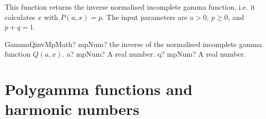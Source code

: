\vspace{0.3cm}
This function returns the inverse normalised incomplete gamma function, i.e. it calculates $x$ with $P(a,x) = p$. The input parameters are $a>0$, $p \geq 0$,  and $p+q=1$. 

\vspace{0.6cm}
\begin{mpFunctionsExtract}
	\mpFunctionTwoNotImplemented
	{GammaQinvMpMath? mpNum? the inverse of the normalised incomplete gamma function $Q(a,x)$.}
	{a? mpNum? A real number.}
	{q? mpNum? A real number.}
\end{mpFunctionsExtract}





\newpage
\section{Polygamma functions and harmonic numbers}

